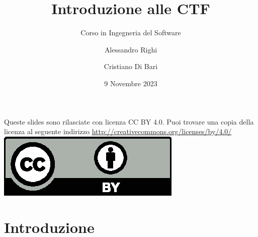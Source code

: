 \documentclass[12pt,handout]{beamer}
\title{Introduzione alle CTF}
\subtitle{Corso in Ingegneria del Software}
\author{Alessandro Righi \and Cristiano Di Bari}
\institute{Università degli Studi di Verona}
\date{9 Novembre 2023}
\begin{document}
\begin{frame}
\titlepage
\end{frame}

\begin{frame}
Queste slides sono rilasciate con licenza CC BY 4.0. Puoi trovare una copia della licenza al seguente indirizzo \url{http://creativecommons.org/licenses/by/4.0/}
\vfill
\center
\includegraphics{img/by.eps}
\end{frame}

\section{Introduzione}
\end{document}
